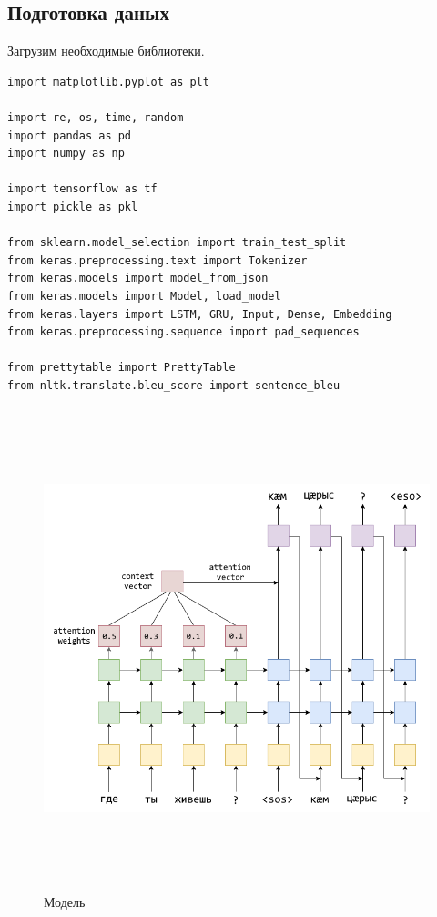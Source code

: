 	\subsection{Подготовка даных}
	
	Загрузим необходимые библиотеки.
	
	\begin{lstlisting}[language=iPython]
import matplotlib.pyplot as plt

import re, os, time, random
import pandas as pd
import numpy as np

import tensorflow as tf
import pickle as pkl

from sklearn.model_selection import train_test_split
from keras.preprocessing.text import Tokenizer
from keras.models import model_from_json
from keras.models import Model, load_model
from keras.layers import LSTM, GRU, Input, Dense, Embedding
from keras.preprocessing.sequence import pad_sequences

from prettytable import PrettyTable
from nltk.translate.bleu_score import sentence_bleu \end{lstlisting}

    \begin{figure}[ht!]
		\centering
		\captionsetup{justification=centering}
		\includegraphics[height=140mm]{img/Model.png}
		\caption{Модель}
	\end{figure}
    \clearpage
	

